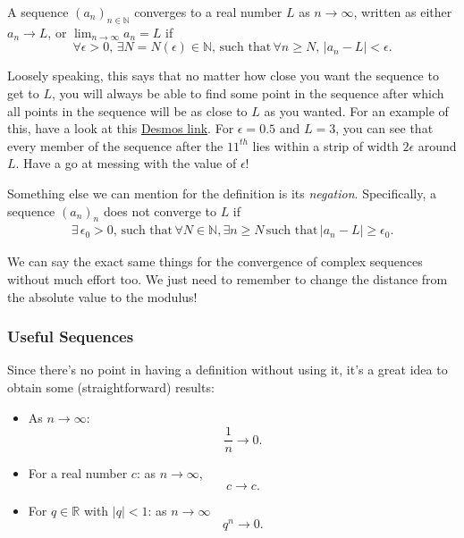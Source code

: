 \documentclass[
  17pt,
  a4paper]{extarticle}
\providecommand{\tightlist}{%
  \setlength{\itemsep}{0pt}\setlength{\parskip}{0pt}}
\theoremstyle{plain}
\theoremstyle{definition}
\theoremstyle{plain}
\theoremstyle{plain}
\theoremstyle{plain}
\theoremstyle{plain}
\theoremstyle{definition}
\theoremstyle{definition}
\theoremstyle{remark}
\theoremstyle{remark}
\let\BeginKnitrBlock\begin \let\EndKnitrBlock\end
\renewcommand{\;}{\,}
\begin{document}
\BeginKnitrBlock{definition}[Sequence Convergence]
{\label{def:def2} }A sequence \((a_n)_{n\in\mathbb{N}}\) converges to a real number \(L\) as \(n \longrightarrow \infty\), written as either \(a_n \longrightarrow L\), or \(\lim_{n \to \infty}a_n = L\) if \[\forall \epsilon > 0, \; \exists N = N(\epsilon) \in \mathbb{N}, \; \text{such that} \; \forall n \geq N, \; \lvert a_n - L \rvert < \epsilon.\]
\EndKnitrBlock{definition}
Loosely speaking, this says that no matter how close you want the sequence to get to \(L\), you will always be able to find some point in the sequence after which all points in the sequence will be as close to \(L\) as you wanted. For an example of this, have a look at this \href{https://www.desmos.com/calculator/dfkjgg0wzj}{Desmos link}. For \(\epsilon = 0.5\) and \(L = 3\), you can see that every member of the sequence after the \(11^{th}\) lies within a strip of width \(2\epsilon\) around \(L\). Have a go at messing with the value of \(\epsilon\)!

Something else we can mention for the definition is its \emph{negation}. Specifically, a sequence \((a_n)_n\) does not converge to \(L\) if
\begin{align*}
    \exists\; \epsilon_0 > 0, \; \text{such that} \; \forall N \in \mathbb{N}, \exists n \geq N \; \text{such that} \; \lvert a_n - L \rvert \geq \epsilon_0.
\end{align*}

We can say the exact same things for the convergence of complex sequences without much effort too. We just need to remember to change the distance from the absolute value to the modulus!

\hypertarget{useful-sequences}{%
\subsubsection{Useful Sequences}\label{useful-sequences}}

Since there's no point in having a definition without using it, it's a great idea to obtain some (straightforward) results:

\begin{itemize}
\tightlist
\item
  As \(n \longrightarrow \infty\): \[\frac{1}{n} \longrightarrow 0.\]
\item
  For a real number \(c\): as \(n \longrightarrow \infty\), \[c \longrightarrow c.\]
\item
  For \(q \in \mathbb{R}\) with \(\lvert q \rvert < 1\): as \(n \longrightarrow \infty\) \[q^n \longrightarrow 0.\]
\end{itemize}
\end{document}
